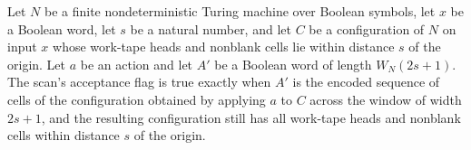 \begin{theorem}
\label{Complexity.Codec.sDone_step}
\leanok
{}
Let $N$ be a finite nondeterministic Turing machine over Boolean symbols, let $x$ be a
Boolean word, let $s$ be a natural number, and let $C$ be a configuration of $N$ on
input $x$ whose work-tape heads and nonblank cells lie within distance $s$ of the
origin. Let $a$ be an action and let $A'$ be a Boolean word of length $W_N(2s+1)$. The
scan’s acceptance flag is true exactly when $A'$ is the encoded sequence of cells of the
configuration obtained by applying $a$ to $C$ across the window of width $2s+1$, and the
resulting configuration still has all work-tape heads and nonblank cells within distance
$s$ of the origin.
\end{theorem}
